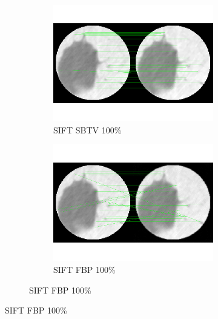 \documentclass[10pt,a4paper,titlepage]{article}
\begin{document}
\begin{figure}
	\begin{figure}[H]
			\begin{subfigure}[b]{0.475\textwidth}
				\includegraphics[width=\textwidth]{Sample1/SIFT/SB/100p.png}
				\caption{SIFT SBTV 100\%}
			\end{subfigure}
			\begin{subfigure}[b]{0.475\textwidth}
				\includegraphics[width=\textwidth]{Sample1/SIFT/FBP/100p.png}
				\caption{SIFT FBP 100\%}
			\end{subfigure}
			

\end{figure}
\end{figure}
\end{document}
